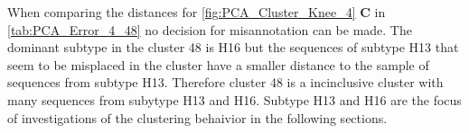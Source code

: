 \begin{table}[!hbt]
    \centering
    \caption[Anomalies in Segment 4 Cluster 48 (\Acrshort{PCA})]{\textbf{Anomalies in Segment 4 Cluster 48 (\Acrshort{PCA}).}.}
    \label{tab:PCA_Error_4_48}
\end{table}

When comparing the distances for \autoref{fig:PCA_Cluster_Knee_4} \textbf{\textsf{C}} in \autoref{tab:PCA_Error_4_48} no decision for misannotation can be made. The dominant subtype in the cluster 48 is H16 but the sequences of subtype H13 that seem to be misplaced in the cluster have a smaller distance to the sample of sequences from subtype H13. Therefore cluster 48 is a incinclusive cluster with many sequences from subytype H13 and H16. Subtype H13 and H16 are the focus of investigations of the clustering behaivior in the following sections.


